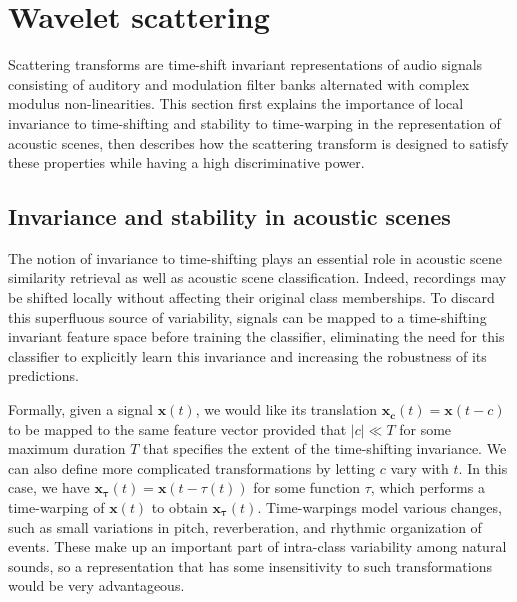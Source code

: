 \documentclass[journal]{IEEEtran}
\newcommand{\ja}[1]{\textcolor{magenta}{Joakim : #1}}
\begin{document}


\section{Wavelet scattering \label{sec:scattering}}

Scattering transforms are time-shift invariant representations of audio signals consisting of auditory and modulation filter banks alternated with complex modulus non-linearities.
This section first explains the importance of local invariance to time-shifting and stability to time-warping in the representation of acoustic scenes, then describes how the scattering transform is designed to satisfy these properties while having a high discriminative power.

\subsection{Invariance and stability in acoustic scenes}
The notion of invariance to time-shifting plays an essential role in acoustic scene similarity retrieval as well as acoustic scene classification.
Indeed, recordings may be shifted locally without affecting their original class memberships.
To discard this superfluous source of variability, signals can be mapped to a time-shifting invariant feature space before training the classifier, eliminating the need for this classifier to explicitly learn this invariance and increasing the robustness of its predictions.

Formally, given a signal $\boldsymbol{x}(t)$, we would like its translation $\boldsymbol{x_c}(t) = \boldsymbol{x}(t-c)$ to be mapped to the same feature vector provided that $|c| \ll T$ for some maximum duration $T$ that specifies the extent of the time-shifting invariance. We can also define more complicated transformations by letting $c$ vary with $t$. In this case, we have $\boldsymbol{x_\tau}(t) = \boldsymbol{x}(t-\tau(t))$ for some function $\tau$, which performs a time-warping of $\boldsymbol{x}(t)$ to obtain $\boldsymbol{x_\tau}(t)$. Time-warpings model various changes, such as small variations in pitch, reverberation, and rhythmic organization of events. These make up an important part of intra-class variability among natural sounds, so a representation that has some insensitivity to such transformations would be very advantageous.
\end{document}
